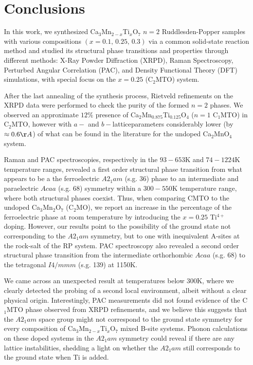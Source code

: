 \section{Conclusions}
	In this work, we synthesized Ca$_{3}$Mn$_{2-x}$Ti$_{x}$O$_{7}$ $n=2$ Ruddlesden-Popper samples with various compositions $(x=0.1,\,0.25,\,0.3)$ via a common solid-state reaction method and studied its structural phase transitions and properties through different methods: X-Ray Powder Diffraction (XRPD), Raman Spectroscopy, Perturbed Angular Correlation (PAC), and Density Functional Theory (DFT) simulations, with special focus on the $x=0.25$ (C$_{2}$MTO) system.
	
	After the last annealing of the synthesis process, Rietveld refinements on the XRPD data were performed to check the purity of the formed $n=2$ phases. We observed an approximate $12\%$ presence of Ca$_{2}$Mn$_{0.875}$Ti$_{0.125}$O$_{4}$ ($n=1$ C$_{1}$MTO) in C$_{2}$MTO, however with $a-$ and $b-$lattice\-parameters considerably lower (by $\approx 0.6\AA$) of what can be found in the literature for the undoped Ca$_{2}$MnO$_{4}$ system.
	
	Raman and PAC spectroscopies, respectively in the $93-653$K and $74-1224$K temperature ranges, revealed a first order structural phase transition from what appears to be a the ferroelectric $A2_{1}am$ (s.g. 36) phase to an intermediate and paraelectric $Acaa$ (s.g. 68) symmetry within a $300-550$K temperature range, where both structural phases coexist. Thus, when comparing CMTO to the undoped Ca$_{3}$Mn$_{2}$O$_{7}$ (C$_{2}$MO), we report an increase in the percentage of the ferroelectric phase at room temperature by introducing the $x=0.25$ Ti$^{4+}$ doping. However, our results point to the possibility of the ground state not corresponding to the $A2_{1}am$ symmetry, but to one with inequivalent A-sites at the rock-salt of the RP system. PAC spectroscopy also revealed a second order structural phase transition from the intermediate orthorhombic $Acaa$ (s.g. 68) to the tetragonal $I4/mmm$ (s.g. 139) at 1150K.
	
	We came across an unexpected result at temperatures below 300K, where we clearly detected the probing of a second local environment, albeit without a clear physical origin. Interestingly, PAC measurements did not found evidence of the C$_{1}$MTO phase observed from XRPD refinements, and we believe this suggests that the $A2_{1}am$ space group might not correspond to the ground state symmetry for every composition of Ca$_{3}$Mn$_{2-x}$Ti$_{x}$O$_{7}$ mixed B-site systems. Phonon calculations on these doped systems in the $A2_{1}am$ symmetry could reveal if there are any lattice instabilities, shedding a light on whether the $A2_{1}am$ still corresponds to the ground state when Ti is added. 
	
